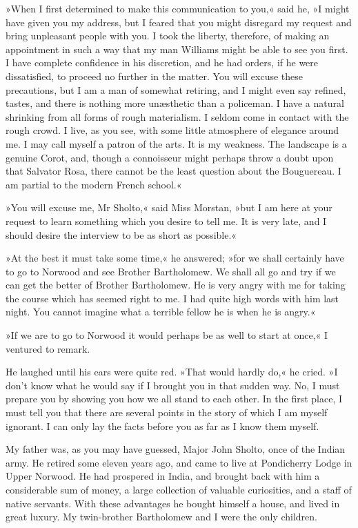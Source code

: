 »When I first determined to make this communication to you,« said he, »I might have given you my address, but I feared that you might disregard my request and bring unpleasant people with you. I took the liberty, therefore, of making an appointment in such a way that my man Williams might be able to see you first. I have complete confidence in his discretion, and he had orders, if he were dissatisfied, to proceed no further in the matter. You will excuse these precautions, but I am a man of somewhat retiring, and I might even say refined, tastes, and there is nothing more unæsthetic than a policeman. I have a natural shrinking from all forms of rough materialism. I seldom come in contact with the rough crowd. I live, as you see, with some little atmosphere of elegance around me. I may call myself a patron of the arts. It is my weakness. The landscape is a genuine Corot, and, though a connoisseur might perhaps throw a doubt upon that Salvator Rosa, there cannot be the least question about the Bouguereau. I am partial to the modern French school.«

»You will excuse me, Mr Sholto,« said Miss Morstan, »but I am here at your request to learn something which you desire to tell me. It is very late, and I should desire the interview to be as short as possible.«

»At the best it must take some time,« he answered; »for we shall certainly have to go to Norwood and see Brother Bartholomew. We shall all go and try if we can get the better of Brother Bartholomew. He is very angry with me for taking the course which has seemed right to me. I had quite high words with him last night. You cannot imagine what a terrible fellow he is when he is angry.«

»If we are to go to Norwood it would perhaps be as well to start at once,« I ventured to remark.

He laughed until his ears were quite red. »That would hardly do,« he cried. »I don't know what he would say if I brought you in that sudden way. No, I must prepare you by showing you how we all stand to each other. In the first place, I must tell you that there are several points in the story of which I am myself ignorant. I can only lay the facts before you as far as I know them myself.

My father was, as you may have guessed, Major John Sholto, once of the Indian army. He retired some eleven years ago, and came to live at Pondicherry Lodge in Upper Norwood. He had prospered in India, and brought back with him a considerable sum of money, a large collection of valuable curiosities, and a staff of native servants. With these advantages he bought himself a house, and lived in great luxury. My twin-brother Bartholomew and I were the only children.

